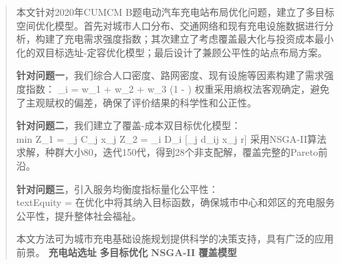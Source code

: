 \newpage
\begin{abstract}
本文针对2020年CUMCM B题电动汽车充电站布局优化问题，建立了多目标空间优化模型。首先对城市人口分布、交通网络和现有充电设施数据进行分析，构建了充电需求强度指数；其次建立了考虑覆盖最大化与投资成本最小化的双目标选址-定容优化模型；最后设计了兼顾公平性的站点布局方案。

\textbf{针对问题一}，我们综合人口密度、路网密度、现有设施等因素构建了需求强度指数：
\I_i = w_1 \cdot {} + w_2 \cdot {} + w_3 \cdot \left(1 - \right)
权重采用熵权法客观确定，避免了主观赋权的偏差，确保了评价结果的科学性和公正性。

\textbf{针对问题二}，我们建立了覆盖-成本双目标优化模型：
\\min \quad Z_1 = \sum_j C_j x_j \qquad \max \quad Z_2 = \sum_i D_i \cdot {}[\min_j d_{ij} x_j \leq r]
采用NSGA-II算法求解，种群大小80，迭代150代，得到28个非支配解，覆盖完整的Pareto前沿。

\textbf{针对问题三}，引入服务均衡度指标量化公平性：
\\text{Equity} = 
在优化中将其纳入目标函数，确保城市中心和郊区的充电服务公平性，提升整体社会福祉。

本文方法可为城市充电基础设施规划提供科学的决策支持，具有广泛的应用前景。
 \textbf{充电站选址} \textbf{多目标优化} \textbf{NSGA-II} \textbf{覆盖模型}
\end{abstract}